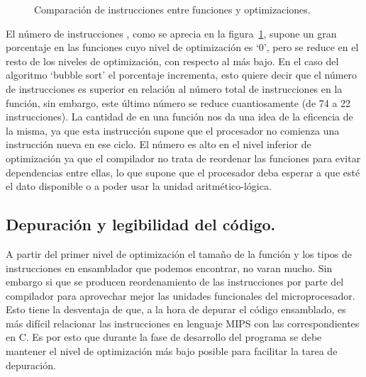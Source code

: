\begin{figure}[htbp]
\begin{center}
\end{center}
\caption{Comparación de instrucciones  entre funciones y optimizaciones.}
\label{graph:nops}
\end{figure}
El número de instrucciones , como se aprecia en la figura~\ref{graph:nops}, supone un gran porcentaje en las funciones cuyo nivel de optimización es `0', pero se reduce en el resto de los niveles de optimización, con respecto al más bajo. En el caso del algoritmo `bubble sort' el porcentaje incrementa, esto quiere decir que el número de instrucciones  es superior en relación al número total de instrucciones en la función, sin embargo, este último número se reduce cuantiosamente (de 74 a 22 instrucciones). La cantidad de  en una función nos da una idea de la eficencia de la misma, ya que esta instrucción supone que el procesador no comienza una instrucción nueva en ese ciclo. El número es alto en el nivel inferior de optimización ya que el compilador no trata de reordenar las funciones para evitar dependencias entre ellas, lo que supone que el procesador deba esperar a que esté el dato disponible o a poder usar la unidad aritmético-lógica.

\subsection{Depuración y legibilidad del código.} %
\label{sub:Depuración y legibilidad del código.}
A partir del primer nivel de optimización el tamaño de la función y los tipos de instrucciones en ensamblador que podemos encontrar, no varan mucho. Sin embargo si que se producen reordenamiento de las instrucciones por parte del compilador para aprovechar mejor las unidades funcionales del microprocesador. Esto tiene la desventaja de que, a la hora de depurar el código ensamblado, es más difícil relacionar las instrucciones en lenguaje MIPS con las correspondientes en C. Es por esto que durante la fase de desarrollo del programa se debe mantener el nivel de optimización más bajo posible para facilitar la tarea de depuración.

